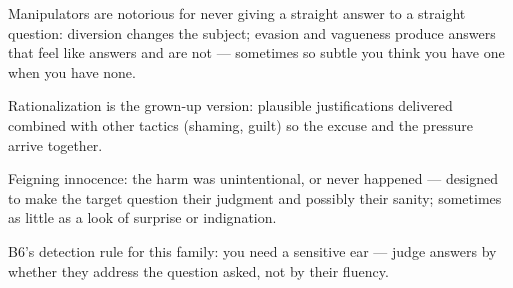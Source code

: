 

\begin{distilled}
  \item Manipulators are notorious for never giving a straight answer to a straight question: diversion changes the subject; evasion and vagueness produce answers that feel like answers and are not --- sometimes so subtle you think you have one when you have none.
  \item Rationalization is the grown-up version: plausible justifications delivered combined with other tactics (shaming, guilt) so the excuse and the pressure arrive together.
  \item Feigning innocence: the harm was unintentional, or never happened --- designed to make the target question their judgment and possibly their sanity; sometimes as little as a look of surprise or indignation.
  \item B6's detection rule for this family: you need a sensitive ear --- judge answers by whether they address the question asked, not by their fluency.
\end{distilled}
